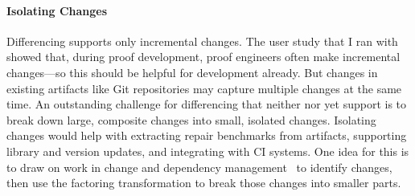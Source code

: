 \paragraph{Isolating Changes} Differencing supports only incremental changes.
The \toolname user study that I ran with  showed that, during proof development,
proof engineers often make incremental changes---so this should be helpful for development already.
But changes in existing artifacts like Git repositories may capture multiple changes at the same time.
An outstanding challenge for differencing that neither \sysname nor \toolnamec yet support
is to break down large, composite changes into small, isolated changes.
Isolating changes would help with extracting repair benchmarks from artifacts, supporting library and version updates, and integrating with CI systems.
One idea for this is to draw on work in change and dependency management~\cite{873647, Autexier:2010:CMH:1986659.1986663, Celik:2017:IRP:3155562.3155588} to identify changes,
then use the factoring transformation to break those changes into smaller parts.


